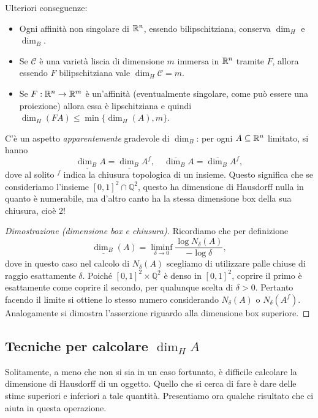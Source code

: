 Ulteriori conseguenze: 
\begin{itemize}
	\item Ogni affinità non singolare di $\mathbb{R}^{n}$, essendo bilipschitziana, conserva $\dim_{H}$ e $\dim_{B}$.
	\item Se $\mathcal C$ è una varietà liscia di dimensione $m$ immersa in $\mathbb{R}^{n}$ tramite $F$, allora essendo $F$ bilipschitziana vale $\dim_{H}\mathcal C = m$.
	\item Se $F:\mathbb{R}^{n}\to\mathbb{R}^{m}$ è un'affinità (eventualmente singolare, come può essere una proiezione) allora essa è lipschitziana e quindi $\dim_{H}(FA)\leq \min\{\dim_{H}(A), m\}$.
\end{itemize}

C'è un aspetto \emph{apparentemente} gradevole di $\dim_{B}$: per ogni $A\subseteq \mathbb{R}^{n}$ limitato, si hanno 
$$\underline{\dim_{B}} A = \underline{\dim_{B}}A^{f},\quad \overline{\dim_{B}} A = \overline{\dim_{B}}A^{f},$$
dove al solito $^{f}$ indica la chiusura topologica di un insieme. 
Questo significa che se consideriamo l'insieme $[0,1]^{2}\cap\mathbb{Q}^{2}$, questo ha dimensione di Hausdorff nulla in quanto è numerabile, ma d'altro canto ha la stessa dimensione box della sua chiusura, cioè 2!
\begin{proof}[Dimostrazione (dimensione box e chiusura)]
	Ricordiamo che per definizione 
	$$\underline{\dim_{B}}(A) = \liminf_{\delta\to0}\frac{\log N_{\delta}(A)}{-\log\delta},$$
	dove in questo caso nel calcolo di $N_{\delta}(A)$ scegliamo di utilizzare palle chiuse di raggio esattamente $\delta$. 
	Poiché $[0,1]^{2}\times\mathbb{Q}^{2}$ è denso in $[0,1]^{2}$, coprire il primo è esattamente come coprire il secondo, per qualunque scelta di $\delta>0$. Pertanto facendo il limite si ottiene lo stesso numero considerando $N_{\delta}(A)$ o $N_{\delta}(A^{f})$.
	Analogamente si dimostra l'asserzione riguardo alla dimensione box superiore. 
\end{proof}

\subsection{Tecniche per calcolare $\dim_{H}A$}

Solitamente, a meno che non si sia in un caso fortunato, è difficile calcolare la dimensione di Hausdorff di un oggetto. Quello che si cerca di fare è dare delle stime superiori e inferiori a tale quantità. Presentiamo ora qualche risultato che ci aiuta in questa operazione. 

